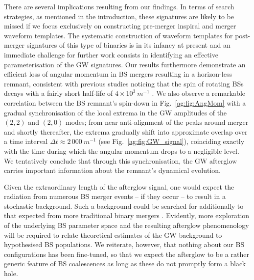 There are several implications resulting from our
findings. In terms of search strategies, as mentioned in the introduction, these signatures are likely to be missed if we focus exclusively on constructing pre-merger inspiral and merger waveform templates. The systematic construction of waveform templates for post-merger signatures of this type of binaries
is in its infancy at present and an immediate challenge
for further work consists in identifying an effective
parameterisation of the GW signatures. Our results furthermore
demonstrate an efficient loss of angular momentum in BS mergers
resulting in a horizon-less remnant, consistent with previous studies noticing that the spin of rotating BSs decays with a fairly short half-life of $4\times 10^3~m^{-1}$ \cite{Sanchis-Gual:2019ljs}. We also observe
a remarkable correlation between the BS remnant's spin-down
in Fig.~\ref{ag:fig:AngMom} with a gradual synchronisation
of the local extrema in the GW amplitudes of the $(2,2)$
and $(2,0)$ modes; from near anti-alignment of the
peaks around merger and shortly thereafter, the extrema
gradually shift into approximate overlap over a time
interval $\Delta t \approx 2\,000~m^{-1}$ (see
Fig.~\ref{ag:fig:GW_signal}), coinciding
exactly with the time during which the angular momentum
drops to a negligible level.
We tentatively conclude that through this synchronisation,
the GW afterglow carries important information about the remnant's dynamical evolution.

Given the extraordinary length of the afterglow signal, one
would expect the radiation from numerous BS merger events
-- if they occur -- to result in a stochastic background.
Such a background could be searched for additionally
to that expected from more traditional binary mergers
\cite{Croon:2018ftb}. Evidently, more exploration of the
underlying BS parameter space and the resulting afterglow
phenomenology will be required to relate theoretical
estimates of the GW background to hypothesised BS populations.
We reiterate, however, that nothing about our BS configurations
has been fine-tuned, so that we expect the afterglow to be a
rather generic feature of BS coalescences as long as these do
not promptly form a black hole.


